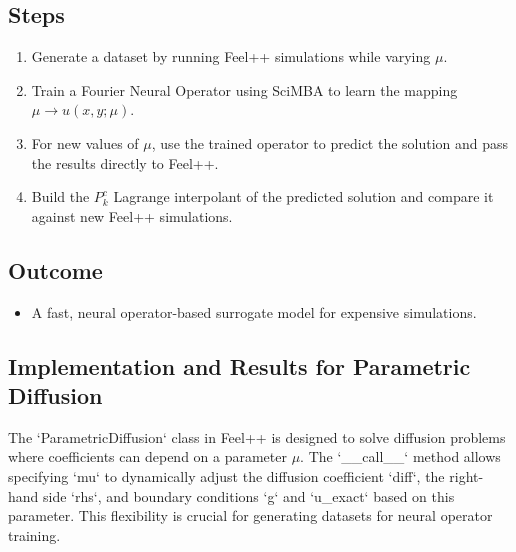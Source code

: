 \documentclass{article}
\begin{document}
\subsection{Steps}
\begin{enumerate}
    \item Generate a dataset by running Feel++ simulations while varying $\mu$.
    \item Train a Fourier Neural Operator using SciMBA to learn the mapping $\mu \to u(x, y; \mu)$.
    \item For new values of $\mu$, use the trained operator to predict the solution and pass the results directly to Feel++.
    \item Build the $P_{k}^{c}$ Lagrange interpolant of the predicted solution and compare it against new Feel++ simulations.
\end{enumerate}

\subsection{Outcome}
\begin{itemize}
    \item A fast, neural operator-based surrogate model for expensive simulations.
\end{itemize}

\subsection{Implementation and Results for Parametric Diffusion}

The `ParametricDiffusion` class in Feel++ is designed to solve diffusion problems where coefficients can depend on a parameter $\mu$. The `__call__` method allows specifying `mu` to dynamically adjust the diffusion coefficient `diff`, the right-hand side `rhs`, and boundary conditions `g` and `u_exact` based on this parameter. This flexibility is crucial for generating datasets for neural operator training.
\end{document}
